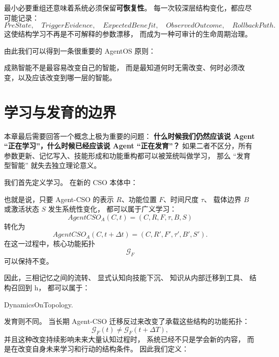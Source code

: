 最小必要重组还意味着系统必须保留\textbf{可恢复性}。
每一次较深层结构变化，都应尽可能记录：
\[
PreState,
\quad
TriggerEvidence,
\quad
ExpectedBenefit,
\quad
ObservedOutcome,
\quad
RollbackPath.
\]
这使结构学习不再是不可解释的参数漂移，
而成为一种可审计的生命周期治理。

由此我们可以得到一条很重要的 AgentOS 原则：
\begin{statementbox}
成熟智能不是最容易改变自己的智能，
而是最知道何时无需改变、何时必须改变，以及应该改变到哪一层的智能。
\end{statementbox}

\section{学习与发育的边界}

本章最后需要回答一个概念上极为重要的问题：
\textbf{什么时候我们仍然应该说 Agent ``正在学习''，什么时候已经应该说 Agent ``正在发育''？}
如果二者不区分，所有参数更新、记忆写入、技能形成和功能重构都可以被笼统叫做学习，
那么 ``发育型智能'' 就失去独立理论意义。

我们首先定义学习。
在新的 CSO 本体中：
\begin{statementbox}
\centering
{}
\end{statementbox}
也就是说，只要 Agent-CSO 的表示 $R$、功能位置 $F$、时间尺度 $\tau$、
载体边界 $B$ 或激活状态 $S$ 发生系统性变化，
都可以属于广义学习：
\[
AgentCSO_A(C,t)
=
(C,R,F,\tau,B,S)
\]
转化为
\[
AgentCSO_A(C,t+\Delta t)
=
(C,R',F',\tau',B',S').
\]
在这一过程中，核心功能拓扑
\[
\mathcal G_F
\]
可以保持不变。

因此，三相记忆之间的流转、
显式认知向技能下沉、
知识从内部迁移到工具、
结构召回到 h，
都可以属于：
\begin{statementbox}
DynamicsOnTopology.
\end{statementbox}

发育则不同。
当长期 Agent-CSO 迁移反过来改变了承载这些结构的功能拓扑：
\[
\mathcal G_F(t)
\neq
\mathcal G_F(t+\Delta T),
\]
并且这种改变持续影响未来大量认知过程时，
系统已经不只是学会新的内容，
而是在改变自身未来学习和行动的结构条件。
因此我们定义：
\begin{statementbox}
\centering
{}
\end{statementbox}


